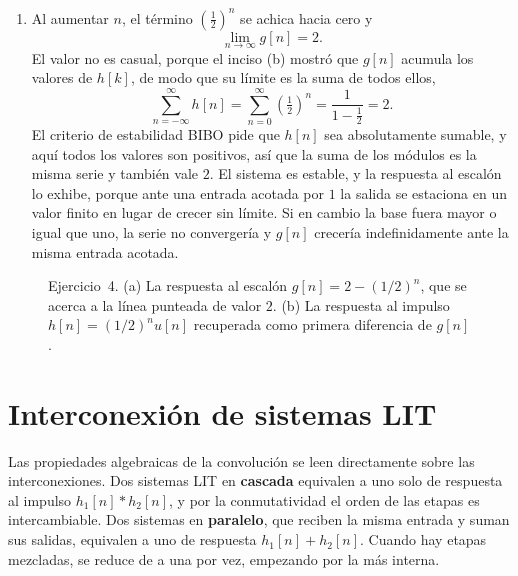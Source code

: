 \documentclass[10pt,a4paper]{article}
\newcommand{\tema}[1]{%
  \bigskip
  \section*{#1}
  \vspace{-0.6em}
}
\begin{document}
\begin{enumerate}
		Que sea la primera diferencia y no otra operación tiene una razón que no depende de
		este sistema. El impulso es la primera diferencia del escalón,
		$\delta[n]=u[n]-u[n-1]$, y el sistema es LIT. Por invarianza temporal, la entrada
		$u[n-1]$ produce la salida $g[n-1]$; por linealidad, la entrada $u[n]-u[n-1]$ produce
		la salida $g[n]-g[n-1]$. Esa entrada es $\delta[n]$ y esa salida es, por definición,
		$h[n]$. La operación que en la entrada convierte el escalón en impulso es la misma
		que en la salida convierte $g[n]$ en $h[n]$.

		\item Al aumentar $n$, el término
		$\left(\tfrac12\right)^n$ se achica hacia cero y
		\[
			\boxed{\;\lim_{n\to\infty} g[n] = 2.\;}
		\]
		El valor no es casual, porque el inciso (b) mostró que $g[n]$ acumula los valores de
		$h[k]$, de modo que su límite es la suma de todos ellos,
		\[
			\sum_{n=-\infty}^{\infty} h[n] = \sum_{n=0}^{\infty} \left(\tfrac{1}{2}\right)^{\!n}
			= \frac{1}{1-\tfrac{1}{2}} = 2.
		\]
		El criterio de estabilidad BIBO pide que $h[n]$ sea absolutamente sumable, y aquí
		todos los valores son positivos, así que la suma de los módulos es la misma serie y
		también vale $2$. El sistema es estable, y la respuesta al escalón lo exhibe, porque
		ante una entrada acotada por $1$ la salida se estaciona en un valor finito en lugar de
		crecer sin límite. Si en cambio la base fuera mayor o igual que uno, la
		serie no convergería y $g[n]$ crecería indefinidamente ante la misma entrada acotada.
	\end{enumerate}

	\begin{figure}[H]
		\centering
		
		\caption{Ejercicio~4. (a) La respuesta al escalón $g[n]=2-(1/2)^n$, que se acerca a
		la línea punteada de valor $2$. (b) La respuesta al impulso $h[n]=(1/2)^n u[n]$
		recuperada como primera diferencia de $g[n]$.}
		\label{fig:sol_ej4}
	\end{figure}

	\tema{Interconexión de sistemas LIT}

	Las propiedades algebraicas de la convolución se leen directamente sobre las
	interconexiones. Dos sistemas LIT en \textbf{cascada} equivalen a uno solo de respuesta
	al impulso $h_1[n]*h_2[n]$, y por la conmutatividad el orden de las etapas es
	intercambiable. Dos sistemas en \textbf{paralelo}, que reciben la misma entrada y suman
	sus salidas, equivalen a uno de respuesta $h_1[n]+h_2[n]$. Cuando hay etapas mezcladas,
	se reduce de a una por vez, empezando por la más interna.
\end{document}
